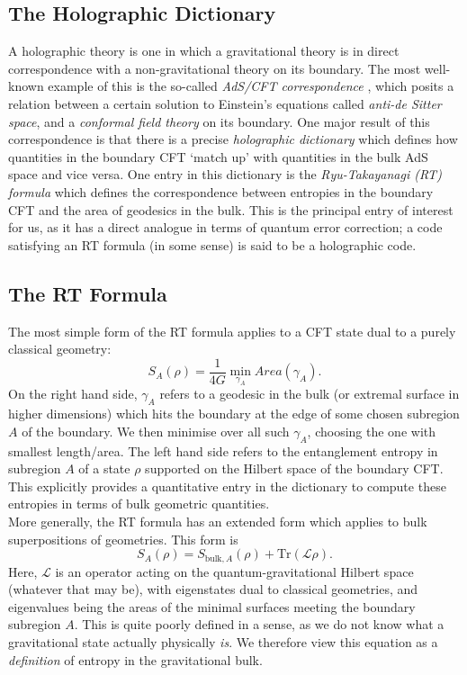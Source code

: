 \documentclass[12pt,a4paper]{report}
\numberwithin{equation}{section}
\newcommand{\tr}{\text{Tr}}
\theoremstyle{definition}
\theoremstyle{theorem}
\theoremstyle{theorem}
\theoremstyle{example}
\theoremstyle{definition}
\begin{document}
\subsection{The Holographic Dictionary}
A holographic theory is one in which a gravitational theory is in direct correspondence with a non-gravitational theory on its boundary. The most well-known example of this is the so-called \textit{AdS/CFT correspondence} \cite{Maldacena}, which posits a relation between a certain solution to Einstein's equations called \textit{anti-de Sitter space}, and a \textit{conformal field theory} on its boundary. One major result of this correspondence is that there is a precise \textit{holographic dictionary} which defines how quantities in the boundary CFT `match up' with quantities in the bulk AdS space and vice versa. One entry in this dictionary is the \textit{Ryu-Takayanagi (RT) formula} which defines the correspondence between entropies in the boundary CFT and the area of geodesics in the bulk. This is the principal entry of interest for us, as it has a direct analogue in terms of quantum error correction; a code satisfying an RT formula (in some sense) is said to be a holographic code.
\subsection{The RT Formula}
The most simple form of the RT formula applies to a CFT state dual to a purely classical geometry:
\begin{equation}
	S_{A}(\rho)=\frac{1}{4G}\min_{\gamma_{A}}Area(\gamma_{A}).
\end{equation}
On the right hand side, $\gamma_{A}$ refers to a geodesic in the bulk (or extremal surface in higher dimensions) which hits the boundary at the edge of some chosen subregion $A$ of the boundary. We then minimise over all such $\gamma_{A}$, choosing the one with smallest length/area. The left hand side refers to the entanglement entropy in subregion $A$ of a state $\rho$ supported on the Hilbert space of the boundary CFT. This explicitly provides a quantitative entry in the dictionary to compute these entropies in terms of bulk geometric quantities.\\
More generally, the RT formula has an extended form which applies to bulk superpositions of geometries. This form is
\begin{equation}\label{RT}
	S_{A}(\rho)=S_{\text{bulk},A}(\rho)+\tr(\mathcal{L}\rho).
\end{equation}
Here, $\mathcal{L}$ is an operator acting on the quantum-gravitational Hilbert space (whatever that may be), with eigenstates dual to classical geometries, and eigenvalues being the areas of the minimal surfaces meeting the boundary subregion $A$. This is quite poorly defined in a sense, as we do not know what a gravitational state actually physically \textit{is}. We therefore view this equation as a \textit{definition} of entropy in the gravitational bulk.
\end{document}

